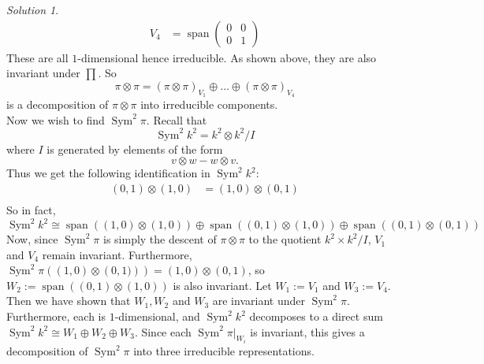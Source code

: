 \documentclass[reqno]{amsart}
\theoremstyle{definition}
\theoremstyle{remark}
\newtheorem*{solution}{Solution}
\DeclareMathOperator{\Span}{span}
\DeclareMathOperator{\Sym}{Sym}
\begin{document}
\begin{solution}
\begin{align*}
            V_4 &= \Span \begin{pmatrix} 0 & 0 \\ 0 & 1 \end{pmatrix} 
        \end{align*}
            These are all $1$-dimensional hence
            irreducible. As shown above,
            they are also invariant under $\prod$.
            So
            \[
            \pi \otimes \pi
            = 
            (\pi \otimes \pi)_{V_1} \oplus
            \ldots \oplus
            (\pi \otimes \pi)_{V_4}
            \] 
            is a decomposition of
            $\pi \otimes \pi$ into irreducible components.\\
            \linebreak
            Now we wish to find
            $\Sym^2 \pi$.
            Recall that
            \[
            \Sym^2 k^2
            = k^2 \otimes k^2 / I
            \] 
            where $I$ is generated by
            elements of the form
            \[
            v \otimes w - w \otimes v.
            \] 
            Thus we get the following identification in
            $\Sym^2 k^2$:
            \begin{align*}
                (0,1) \otimes (1,0) 
                &= \left( 1,0 \right) \otimes (0,1)\\
            \end{align*}
            So in fact,
            \[
            \Sym^2 k^2
            \cong
            \Span \left( \left( 1,0 \right) \otimes 
            (1,0) \right) \oplus
            \Span \left( \left( 0,1 \right) \otimes
            (1,0)\right) 
            \oplus
            \Span\left( (0,1) \otimes (0,1) \right) 
            \] 
            Now, since
            $\Sym^2 \pi$ is simply the descent of
            $\pi \otimes \pi$ to the quotient
            $k^2 \times k^2 / I$, 
            $V_1$ and $V_4$ remain invariant. Furthermore,
            $\Sym^2 \pi 
            \left( \left( 1,0 \right) \otimes
            \left( 0,1) \right) \right) 
            = \left( 1,0 \right) \otimes
            (0,1)$, so
            $W_2:= \Span
            \left( \left( 0,1 \right) \otimes
            (1,0)\right) $ is also invariant.
            Let $W_1 := V_1$ and
            $W_3 := V_4$. Then
            we have shown that
            $W_1,W_2$ and $W_3$ are invariant under
            $\Sym^2 \pi$.
            Furthermore, each is $1$-dimensional, and 
            $\Sym^2 k^2$ decomposes to a
            direct sum
            $\Sym^2 k^2 \cong
            W_1 \oplus W_2 \oplus W_3$.
            Since each
            $\Sym^2 \pi|_{W_i}$ is invariant, this gives
            a decomposition of
            $\Sym^2 \pi$ into three irreducible representations.







    \end{solution}

    



\end{document}
